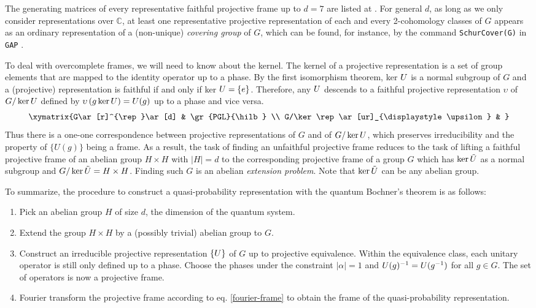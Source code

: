 The generating matrices of every representative faithful projective frame up
to $d=7$ are listed at \cite{klappenecker_beyond_2002}.
For general $d$, as long as we only consider representations over $\mathbb{C}$, at least one representative projective representation of each and every 2-cohomology classes of $G$ appears as an ordinary representation of a (non-unique) \emph{covering group} of $G$, which can be found, for instance, by the command \texttt{SchurCover(G)}
in \texttt{GAP} \cite{GAP4}.


To deal with overcomplete frames, we will need to know about the kernel. The kernel of a projective representation is a set of group elements that are mapped to the identity operator up to a phase. By the first isomorphism theorem, ker $U$ is a normal subgroup of $G$ and a (projective) representation is faithful if and only if ker $U=\{ e \} $. Therefore, any $U$ descends to a faithful projective representation $\upsilon$ of $G/\ker U$ defined by $\upsilon\left(g\ker U\right)=U(g)$ up to a phase and vice versa.
\begin{align}
\xymatrix{G\ar[r]^{\rep}\ar[d] & \gr{PGL}{\hilb} \\
	G/\ker\rep \ar[ur]_{\displaystyle \upsilon} & }
\end{align}
Thus there is a one-one correspondence between projective representations of $G$ and of $G/\ker U$, which preserves irreducibility and the property of $\{ U(g) \}$ being a frame. As a result, the task of finding an unfaithful projective frame reduces to the task of lifting a faithful projective frame of an abelian group $H \times H$ with $ |H|= d$ to the corresponding projective frame of a group $G$ which has $\ker\tilde{U}$ as a normal subgroup and $G/\ker\tilde{U} = H \times H$. Finding such $G$ is an abelian \emph{extension problem}. Note that $\ker\tilde{U}$ can be any abelian group.

To summarize, the procedure to construct a quasi-probability representation with the quantum Bochner's theorem is as follows:
\begin{enumerate}
	\item Pick an abelian group $H$ of size $d$, the dimension of the quantum system.
	\item Extend the group $H \times H$ by a (possibly trivial) abelian group to $G$.
	\item Construct an irreducible projective representation $\{U\}$ of $G$ up to projective equivalence. Within the equivalence class, each unitary operator is still only defined up to a phase. Choose the phases under the constraint $|\alpha|=1$ and $U(g)^{-1}=U(g^{-1})$ for all $g\in G$. The set of operators is now a projective frame.
	\item Fourier transform the projective frame according to eq. \eqref{fourier-frame} to obtain the frame of the quasi-probability representation.
\end{enumerate}

